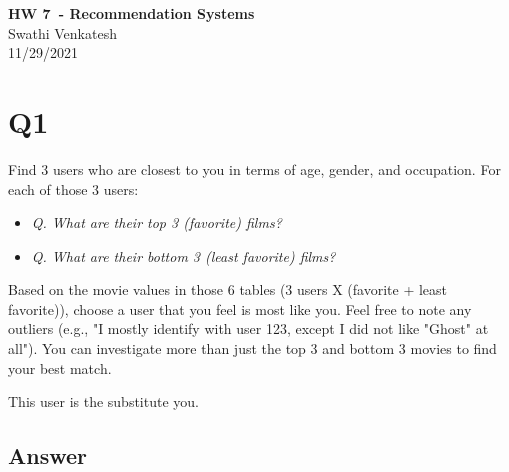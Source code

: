 \documentclass[12pt]{article}
\begin{document}
\begin{centering}
{\large\textbf{HW 7\ - Recommendation Systems}}\\ 
Swathi Venkatesh\\
11/29/2021\\
\end{centering}


\section*{Q1}
Find 3 users who are closest to you in terms of age, gender, and occupation.
For each of those 3 users:
\begin{itemize}
        \item \emph{Q. What are their top 3 (favorite) films?}
        \item \emph{Q. What are their bottom 3 (least favorite) films?}
    \end{itemize}
Based on the movie values in those 6 tables (3 users X (favorite + least favorite)), choose a user that you feel is most like you. Feel free to note any outliers (e.g., "I mostly identify with user 123, except I did not like "Ghost" at all"). You can investigate more than just the top 3 and bottom 3 movies to find your best match.

This user is the substitute you.

\subsection*{Answer}
\end{document}
